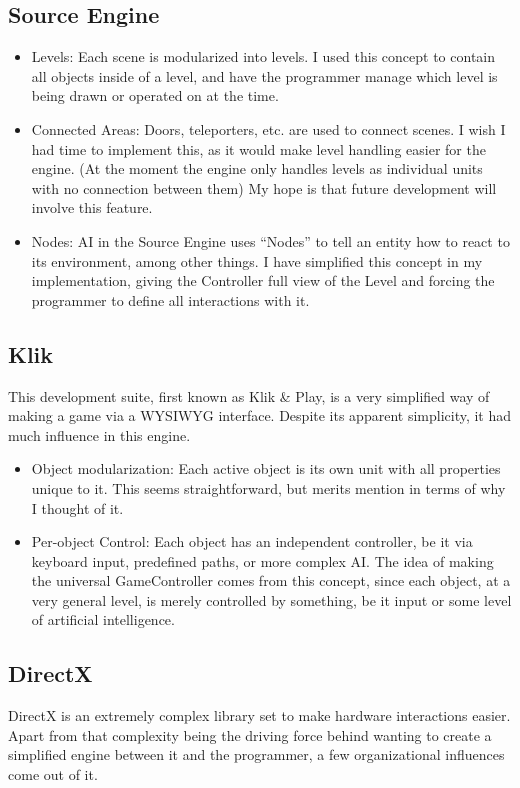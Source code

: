 \documentclass[12pt]{article}
\begin{document}
\subsection{Source Engine}
\begin{itemize}
 \item Levels: Each scene is modularized into levels. I used this concept to contain all objects inside of a level, and have the programmer manage which level is being drawn or operated on at the time.
 \item Connected Areas: Doors, teleporters, etc. are used to connect scenes. I wish I had time to implement this, as it would make level handling easier for the engine. (At the moment the engine only handles levels as individual units with no connection between them) My hope is that future development will involve this feature.
 \item Nodes: AI in the Source Engine uses ``Nodes'' to tell an entity how to react to its environment, among other things. I have simplified this concept in my implementation, giving the Controller full view of the Level and forcing the programmer to define all interactions with it.
\end{itemize}

\subsection{Klik}
This development suite, first known as Klik \& Play, is a very simplified way of making a game via a WYSIWYG interface. Despite its apparent simplicity, it had much influence in this engine.

\begin{itemize}
 \item Object modularization: Each active object is its own unit with all properties unique to it. This seems straightforward, but merits mention in terms of why I thought of it.
 \item Per-object Control: Each object has an independent controller, be it via keyboard input, predefined paths, or more complex AI. The idea of making the universal GameController comes from this concept, since each object, at a very general level, is merely controlled by something, be it input or some level of artificial intelligence.
\end{itemize}

\subsection{DirectX}
DirectX is an extremely complex library set to make hardware interactions easier. Apart from that complexity being the driving force behind wanting to create a simplified engine between it and the programmer, a few organizational influences come out of it.
\end{document}
